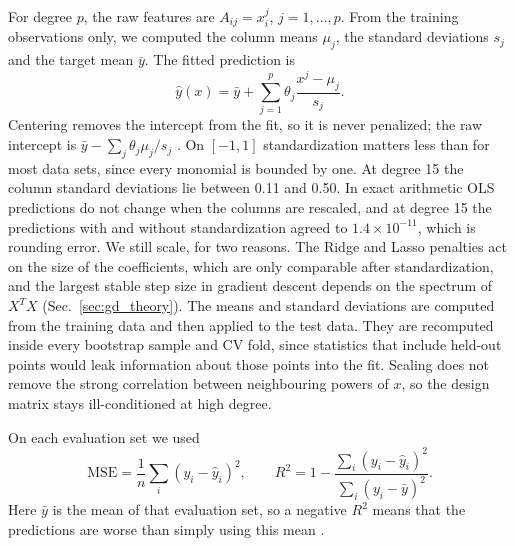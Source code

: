 \documentclass[aps,prb,reprint,superscriptaddress,nofootinbib,longbibliography,floatfix]{revtex4-2}
\newcommand{\MSE}{\mathrm{MSE}}
\begin{document}
For degree $p$, the raw features are $A_{ij}=x_i^j$, $j=1,\ldots,p$. From the training observations only, we computed the column means $\mu_j$, the standard deviations $s_j$ and the target mean $\bar y$. The fitted prediction is
\begin{equation}
\widehat y(x)=\bar y+\sum_{j=1}^p\theta_j\frac{x^j-\mu_j}{s_j}.
\end{equation}
Centering removes the intercept from the fit, so it is never penalized; the raw intercept is $\bar y-\sum_j\theta_j\mu_j/s_j$ \cite[Sec.~3.13]{HjorthJensen2026}. On $[-1,1]$ standardization matters less than for most data sets, since every monomial is bounded by one. At degree 15 the column standard deviations lie between 0.11 and 0.50. In exact arithmetic OLS predictions do not change when the columns are rescaled, and at degree 15 the predictions with and without standardization agreed to $1.4\times10^{-11}$, which is rounding error. We still scale, for two reasons. The Ridge and Lasso penalties act on the size of the coefficients, which are only comparable after standardization, and the largest stable step size in gradient descent depends on the spectrum of $X^TX$ (Sec.~\ref{sec:gd_theory}). The means and standard deviations are computed from the training data and then applied to the test data. They are recomputed inside every bootstrap sample and CV fold, since statistics that include held-out points would leak information about those points into the fit. Scaling does not remove the strong correlation between neighbouring powers of $x$, so the design matrix stays ill-conditioned at high degree.

On each evaluation set we used
\begin{equation}
\MSE=\frac1n\sum_i(y_i-\widehat y_i)^2,\qquad
R^2=1-\frac{\sum_i(y_i-\widehat y_i)^2}{\sum_i(y_i-\bar y)^2}.
\end{equation}
Here $\bar y$ is the mean of that evaluation set, so a negative $R^2$ means that the predictions are worse than simply using this mean \cite[Sec.~3.5]{HjorthJensen2026}.
\end{document}
